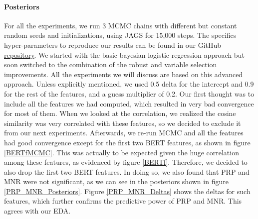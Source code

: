 \documentclass[man, floatsintext, 10pt]{apa6}
\begin{document}
\vspace{2mm}

\paragraph{Posteriors} For all the experiments, we run 3 MCMC chains with different but constant random seeds and initializations, using JAGS for 15,000 steps. The specifics hyper-parameters to reproduce our results can be found in our GitHub \href{https://github.com/seanpili/-fakesAreBAye/blob/master/RecurrentUsers/experiments.txt}{repository}. We started with the basic bayesian logistic regression approach but soon switched to the combination of the robust and variable selection improvements. All the experiments we will discuss are based on this advanced approach. Unless explicitly mentioned, we used 0.5 delta for the intercept and 0.9 for the rest of the features, and a guess multiplier of 0.2. Our first thought was to include all the features we had computed, which resulted in very bad convergence for most of them. When we looked at the correlation, we realized the cosine similarity was very correlated with these features, so we decided to exclude it from our next experiments. Afterwards, we re-run MCMC and all the features had good convergence except for the first two BERT features, as shown in figure \ref{BERTfMCMC}. This was actually to be expected given the huge correlation among these features, as evidenced by figure \ref{BERTf}. Therefore, we decided to also drop the first two BERT features. In doing so, we also found that PRP and MNR were not significant, as we can see in the posteriors shown in figure \ref{PRP_MNR_Posteriors}. Figure \ref{PRP_MNR_Deltas} shows the deltas for such features, which further confirms the  predictive power of PRP and MNR. This agrees with our EDA.
\end{document}
